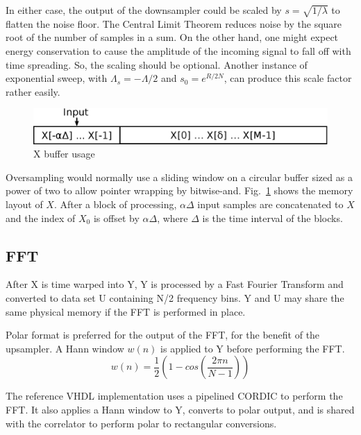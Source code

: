 In either case, the output of the downsampler could be scaled by
$s=\sqrt{1/\lambda}$ to flatten the noise floor.
The Central Limit Theorem reduces noise
by the square root of the number of samples in a sum.
On the other hand, one might expect energy conservation to cause the
amplitude of the incoming signal to fall off with time spreading.
So, the scaling should be optional.
Another instance of exponential sweep, with $\Lambda_s = -\Lambda/2$
and $s_0 = e^{R/2N}$,
can produce this scale factor rather easily.

\begin{figure}
	\centering
	\includegraphics[width=0.95\linewidth]{../source/xbuf_e}
	\caption[X buffer usage]{X buffer usage}
	\label{fig:xbuf}
\end{figure}

Oversampling would normally use a sliding window on a circular buffer sized as
a power of two to allow pointer wrapping by bitwise-and.
Fig.~\ref{fig:xbuf} shows the memory layout of $X$.
After a block of processing, $\alpha\Delta$ input samples are concatenated to
$X$ and the index of $X_0$ is offset by $\alpha\Delta$,
where $\Delta$ is the time interval of the blocks.

\subsection{FFT}

After X is time warped into Y, Y is processed by a Fast Fourier Transform and
converted to data set U containing N/2 frequency bins. Y and U may share the
same physical memory if the FFT is performed in place.

Polar format is preferred for the output of the FFT,
for the benefit of the upsampler.
A Hann window $w(n)$ is applied to Y before performing the FFT.
\begin{equation}
w(n) = \frac{1}{2}\left(1 - cos\left( \frac{2\pi n}{N-1} \right)\right)
\end{equation}


The reference VHDL implementation uses a pipelined CORDIC to perform the FFT.
It also applies a Hann window to Y, converts to polar output, and is shared with
the correlator to perform polar to rectangular conversions.


